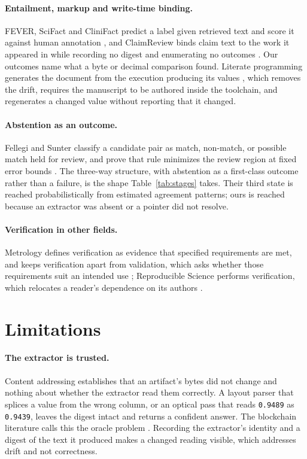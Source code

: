 \documentclass{article}
\newcommand{\code}[1]{\texttt{#1}}
\begin{document}
\paragraph{Entailment, markup and write-time binding.} FEVER, SciFact and CliniFact predict a
label given retrieved text and score it against human annotation
\citep{thorne2018fever,wadden2020scifact,clinifact2025}, and ClaimReview binds claim text to the
work it appeared in while recording no digest and enumerating no outcomes
\citep{schemaorg2026claimreview}. Our outcomes name what a byte or decimal comparison found.
Literate programming generates the document from the execution producing its values
\citep{leisch2002sweave}, which removes the drift, requires the manuscript to be authored inside
the toolchain, and regenerates a changed value without reporting that it changed.

\paragraph{Abstention as an outcome.} Fellegi and Sunter classify a candidate pair as match,
non-match, or possible match held for review, and prove that rule minimizes the review region at
fixed error bounds \citep{fellegi1969linkage}. The three-way structure, with abstention as a
first-class outcome rather than a failure, is the shape Table~\ref{tab:stages} takes. Their third
state is reached probabilistically from estimated agreement patterns; ours is reached because an
extractor was absent or a pointer did not resolve.

\paragraph{Verification in other fields.} Metrology defines verification as evidence that specified
requirements are met, and keeps verification apart from validation, which asks whether those
requirements suit an intended use \citep{jcgm2012vim}; Reproducible Science performs verification, which relocates a reader's dependence on its authors \citep{hardwig1985dependence}.

\section{Limitations}
\label{sec:limits}

\paragraph{The extractor is trusted.} Content addressing establishes that an artifact's bytes did
not change and nothing about whether the extractor read them correctly. A layout parser that
splices a value from the wrong column, or an optical pass that reads \code{0.9489} as
\code{0.9439}, leaves the digest intact and returns a confident answer. The blockchain literature calls this the
oracle problem \citep{albizri2021oracle}. Recording the extractor's identity and a digest of the text it produced
makes a changed reading visible, which addresses drift and not correctness.
\end{document}
